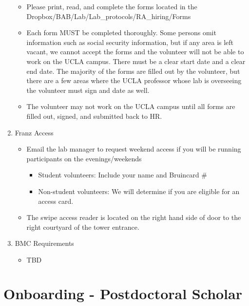 \documentclass[]{book}
\providecommand{\tightlist}{%
  \setlength{\itemsep}{0pt}\setlength{\parskip}{0pt}}
\begin{document}
\begin{enumerate}
  \begin{itemize}
  \tightlist
  \item
    Please print, read, and complete the forms located in the Dropbox/BAB/Lab/Lab\_protocols/RA\_hiring/Forms
  \item
    Each form MUST be completed thoroughly. Some persons omit information such as social security information, but if any area is left vacant, we cannot accept the forms and the volunteer will not be able to work on the UCLA campus. There must be a clear start date and a clear end date. The majority of the forms are filled out by the volunteer, but there are a few areas where the UCLA professor whose lab is overseeing the volunteer must sign and date as well.
  \item
    The volunteer may not work on the UCLA campus until all forms are filled out, signed, and submitted back to HR.
  \end{itemize}
\item
  Franz Access

  \begin{itemize}
  \tightlist
  \item
    Email the lab manager to request weekend access if you will be running participants on the evenings/weekends

    \begin{itemize}
    \tightlist
    \item
      Student volunteers: Include your name and Bruincard \#
    \item
      Non-student volunteers: We will determine if you are eligible for an access card.
    \end{itemize}
  \item
    The swipe access reader is located on the right hand side of door to the right courtyard of the tower entrance.
  \end{itemize}
\item
  BMC Requirements

  \begin{itemize}
  \tightlist
  \item
    TBD
  \end{itemize}
\end{enumerate}

\hypertarget{onboarding---postdoctoral-scholar}{%
\section{Onboarding - Postdoctoral Scholar}\label{onboarding---postdoctoral-scholar}}
\end{document}
